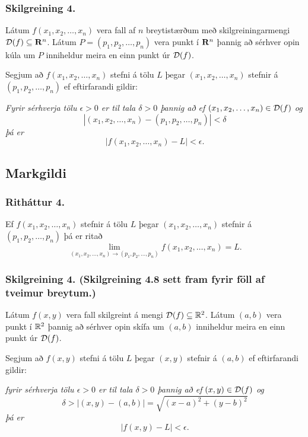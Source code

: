  \subsubsection{Skilgreining 4.}
Látum $f(x_1,x_2,\ldots,x_n)$ vera fall af
$n$ breytistærðum með skilgreiningarmengi ${\cal D}(f)\subseteq \mbox{${\bf R}^n$}$.
Látum $P=(p_1,p_2,\ldots,p_n)$ vera punkt í $\mbox{${\bf R}^n$}$ þannig að sérhver
opin kúla um $P$ inniheldur meira en einn punkt úr ${\cal D}(f)$. 

\smallskip 
\noindent
Segjum að $f(x_1,x_2,\ldots,x_n)$  stefni á tölu $L$ þegar
$(x_1,x_2,\ldots,x_n)$  stefnir á $(p_1,p_2,\ldots,p_n)$ ef
eftirfarandi gildir: 

\smallskip
\noindent
{\em Fyrir sérhverja tölu $\epsilon>0$ er til tala $\delta>0$
þannig að ef $(x_1,x_2,\ldots,x_n)\in{\cal D}(f)$ og  
$$|(x_1,x_2,\ldots,x_n)-(p_1,p_2,\ldots,p_n)|<\delta$$ 
þá er 
$$|f(x_1,x_2,\ldots,x_n)-L|<\epsilon.$$}



\subsection{Markgildi}
\subsubsection{Ritháttur 4.}
Ef $f(x_1,x_2,\ldots,x_n)$  stefnir á tölu $L$ þegar $(x_1,x_2,\ldots,x_n)$  stefnir á $(p_1,p_2,\ldots,p_n)$ þá er ritað 
$$\lim_{(x_1,x_2,\ldots,x_n)\rightarrow (p_1,p_2,\ldots,p_n)}
f(x_1,x_2,\ldots,x_n)=L.$$
 

 \subsubsection{Skilgreining 4. (Skilgreining 4.8 sett fram fyrir föll af tveimur breytum.)  }
 
  
Látum $f(x,y)$ vera fall skilgreint á mengi  ${\cal D}(f)\subseteq {\mathbb R}^2$.  Látum $(a,b)$ vera punkt í ${\mathbb R}^2$ þannig að sérhver opin skífa um $(a,b)$ inniheldur meira en einn punkt úr ${\cal D}(f)$.

Segjum að $f(x,y)$  stefni á tölu $L$ þegar $(x,y)$  stefnir á $(a,b)$ ef eftirfarandi gildir:

\smallskip
\noindent
{\em fyrir sérhverja tölu $\epsilon>0$ er til tala $\delta>0$
þannig að ef $(x,y)\in{\cal D}(f)$ og
$$\delta>|(x,y)-(a,b)|=\sqrt{(x-a)^2+(y-b)^2}$$ 
þá er  
$$|f(x,y)-L|<\epsilon.$$}

